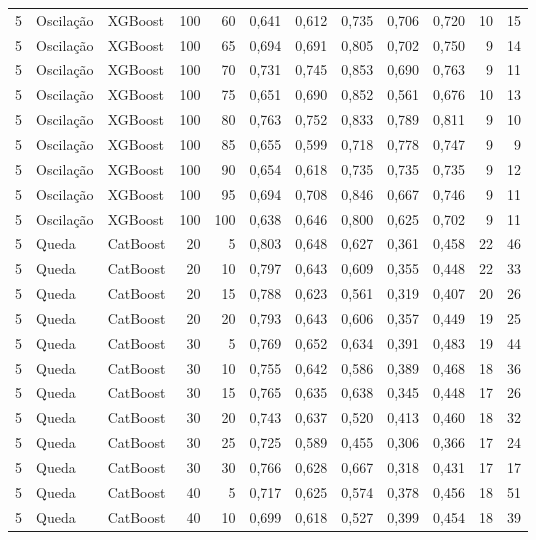 \begin{longtable}{@{}rllrrrrrrrrr@{}}
5 & Oscilação & XGBoost & 100 & 60 & 0,641 & 0,612 & 0,735 & 0,706 & 0,720 & 10 & 15 \\
5 & Oscilação & XGBoost & 100 & 65 & 0,694 & 0,691 & 0,805 & 0,702 & 0,750 & 9 & 14 \\
5 & Oscilação & XGBoost & 100 & 70 & 0,731 & 0,745 & 0,853 & 0,690 & 0,763 & 9 & 11 \\
5 & Oscilação & XGBoost & 100 & 75 & 0,651 & 0,690 & 0,852 & 0,561 & 0,676 & 10 & 13 \\
5 & Oscilação & XGBoost & 100 & 80 & 0,763 & 0,752 & 0,833 & 0,789 & 0,811 & 9 & 10 \\
5 & Oscilação & XGBoost & 100 & 85 & 0,655 & 0,599 & 0,718 & 0,778 & 0,747 & 9 & 9 \\
5 & Oscilação & XGBoost & 100 & 90 & 0,654 & 0,618 & 0,735 & 0,735 & 0,735 & 9 & 12 \\
5 & Oscilação & XGBoost & 100 & 95 & 0,694 & 0,708 & 0,846 & 0,667 & 0,746 & 9 & 11 \\
5 & Oscilação & XGBoost & 100 & 100 & 0,638 & 0,646 & 0,800 & 0,625 & 0,702 & 9 & 11 \\
5 & Queda & CatBoost & 20 & 5 & 0,803 & 0,648 & 0,627 & 0,361 & 0,458 & 22 & 46 \\
5 & Queda & CatBoost & 20 & 10 & 0,797 & 0,643 & 0,609 & 0,355 & 0,448 & 22 & 33 \\
5 & Queda & CatBoost & 20 & 15 & 0,788 & 0,623 & 0,561 & 0,319 & 0,407 & 20 & 26 \\
5 & Queda & CatBoost & 20 & 20 & 0,793 & 0,643 & 0,606 & 0,357 & 0,449 & 19 & 25 \\
5 & Queda & CatBoost & 30 & 5 & 0,769 & 0,652 & 0,634 & 0,391 & 0,483 & 19 & 44 \\
5 & Queda & CatBoost & 30 & 10 & 0,755 & 0,642 & 0,586 & 0,389 & 0,468 & 18 & 36 \\
5 & Queda & CatBoost & 30 & 15 & 0,765 & 0,635 & 0,638 & 0,345 & 0,448 & 17 & 26 \\
5 & Queda & CatBoost & 30 & 20 & 0,743 & 0,637 & 0,520 & 0,413 & 0,460 & 18 & 32 \\
5 & Queda & CatBoost & 30 & 25 & 0,725 & 0,589 & 0,455 & 0,306 & 0,366 & 17 & 24 \\
5 & Queda & CatBoost & 30 & 30 & 0,766 & 0,628 & 0,667 & 0,318 & 0,431 & 17 & 17 \\
5 & Queda & CatBoost & 40 & 5 & 0,717 & 0,625 & 0,574 & 0,378 & 0,456 & 18 & 51 \\
5 & Queda & CatBoost & 40 & 10 & 0,699 & 0,618 & 0,527 & 0,399 & 0,454 & 18 & 39 \\

\end{longtable}
